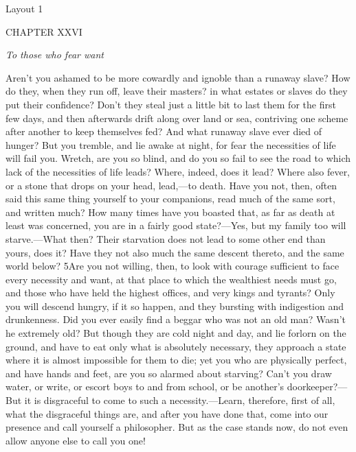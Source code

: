 

Layout 1

CHAPTER XXVI

\emph{To those who fear want}

Aren't you ashamed to be more cowardly and ignoble than a runaway slave? How do they, when they run off, leave their masters? in what estates or slaves do they put their confidence? Don't they steal just a little bit to last them for the first few days, and then afterwards drift along over land or sea, contriving one scheme after another to keep themselves fed? And what runaway slave ever died of hunger? But you tremble, and lie awake at night, for fear the necessities of life will fail you. Wretch, are you so blind, and do you so fail to see the road to which lack of the necessities of life leads? Where, indeed, does it lead? Where also fever, or a stone that drops on your head, lead,—to death. Have you not, then, often said this same thing yourself to your companions, read much of the same sort, and written much? How many times have you boasted that, as far as death at least was concerned, you are in a fairly good state?—Yes, but my family too will starve.—What then? Their starvation does not lead to some other end than yours, does it? Have they not also much the same descent thereto, and the same world below? 5Are you not willing, then, to look with courage sufficient to face every necessity and want, at that place to which the wealthiest needs must go, and those who have held the highest offices, and very kings and tyrants? Only you will descend hungry, if it so happen, and they bursting with indigestion and drunkenness. Did you ever easily find a beggar who was not an old man? Wasn't he extremely old? But though they are cold night and day, and lie forlorn on the ground, and have to eat only what is absolutely necessary, they approach a state where it is almost impossible for them to die; yet you who are physically perfect, and have hands and feet, are you so alarmed about starving? Can't you draw water, or write, or escort boys to and from school, or be another's doorkeeper?—But it is disgraceful to come to such a necessity.—Learn, therefore, first of all, what the disgraceful things are, and after you have done that, come into our presence and call yourself a philosopher. But as the case stands now, do not even allow anyone else to call you one!

